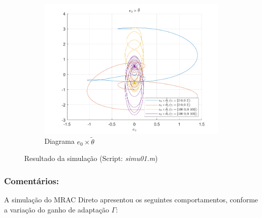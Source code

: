 \documentclass[10pt]{article}
\begin{document}
\begin{figure}[h!]
    \begin{subfigure}[b]{0.35\textwidth}
        \centering
        \includegraphics[width=\textwidth]{img/fig01d.png}
        \caption{Diagrama $e_0 \times \tilde{\theta}$}
    \end{subfigure}

    \caption{Resultado da simulação (Script: \textit{simu01.m})}
    \label{fig:sim1}
\end{figure}

\subsubsection{Comentários:}

A simulação do MRAC Direto apresentou os seguintes comportamentos, conforme a variação do ganho de adaptação $\Gamma$:
\end{document}
